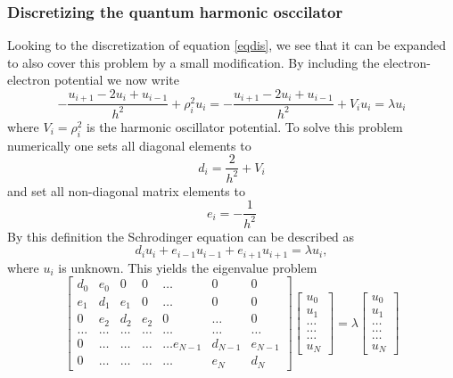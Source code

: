 \documentclass[%
reprint,
amsmath,amssymb,
aps,
]{revtex4-1}
\begin{document}
\subsubsection{Discretizing the quantum harmonic osccilator}
Looking to the discretization of equation \ref{eqdis}, we see that it can be expanded to also cover this problem by a small modification. By including the electron-electron potential we now write 
\begin{equation}\label{eqho2}
	-\frac{u_{i+1} -2u_i +u_{i-1}}{h^2}+\rho_i^2u_i=-\frac{u_{i+1} -2u_i +u_{i-1} }{h^2}+V_iu_i  = \lambda u_i
\end{equation}
where $V_i=\rho_i^2$ is the harmonic oscillator potential. To solve this problem numerically one sets all diagonal elements to 
\begin{equation}\label{hoeq3}
d_i=\frac{2}{h^2}+V_i
\end{equation}
and set all non-diagonal matrix elements to
\begin{equation}\label{hoeq4}
e_i=-\frac{1}{h^2}
\end{equation}
By this definition the Schrodinger equation can be described as
\begin{equation*}
d_iu_i+e_{i-1}u_{i-1}+e_{i+1}u_{i+1}  = \lambda u_i,
\end{equation*}
where $u_i$ is unknown. This yields the eigenvalue problem
\begin{equation}\label{evho}
\begin{bmatrix}d_0 & e_0 & 0   & 0    & \dots  &0     & 0 \\
e_1 & d_1 & e_1 & 0    & \dots  &0     &0 \\
0   & e_2 & d_2 & e_2  &0       &\dots & 0\\
\dots  & \dots & \dots & \dots  &\dots      &\dots & \dots\\
0   & \dots & \dots & \dots  &\dots  e_{N-1}     &d_{N-1} & e_{N-1}\\
0   & \dots & \dots & \dots  &\dots       &e_{N} & d_{N}
\end{bmatrix}  \begin{bmatrix} u_{0} \\
u_{1} \\
\dots\\ \dots\\ \dots\\
u_{N}
\end{bmatrix}=\lambda \begin{bmatrix} u_{0} \\
u_{1} \\
\dots\\ \dots\\ \dots\\
u_{N}
\end{bmatrix}
\end{equation}
\end{document}
